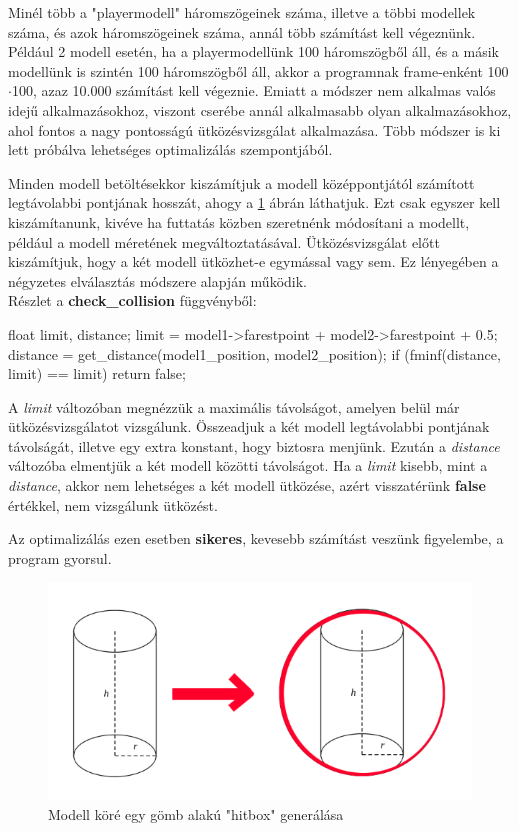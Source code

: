 
Minél több a "playermodell" háromszögeinek száma, illetve a többi modellek száma, és azok háromszögeinek száma, annál több számítást kell végeznünk. Például 2 modell esetén, ha a playermodellünk 100 háromszögből áll, és a másik modellünk is szintén 100 háromszögből áll, akkor a programnak frame-enként 100$\cdot$100, azaz 10.000 számítást kell végeznie. Emiatt a módszer nem alkalmas valós idejű alkalmazásokhoz, viszont cserébe annál alkalmasabb olyan alkalmazásokhoz, ahol fontos a nagy pontosságú ütközésvizsgálat alkalmazása. Több módszer is ki lett próbálva lehetséges optimalizálás szempontjából.

Minden modell betöltésekkor kiszámítjuk a modell középpontjától számított legtávolabbi pontjának hosszát, ahogy a \ref{fig:opt_1} ábrán láthatjuk. Ezt csak egyszer kell kiszámítanunk, kivéve ha futtatás közben szeretnénk módosítani a modellt, például a modell méretének megváltoztatásával. Ütközésvizsgálat előtt kiszámítjuk, hogy a két modell ütközhet-e egymással vagy sem. Ez lényegében a négyzetes elválasztás módszere alapján működik.
\\
Részlet a \textbf{check\_collision} függvényből:
\begin{cpp}
float limit, distance;
limit = model1->farestpoint + model2->farestpoint + 0.5;
distance = get_distance(model1_position, model2_position);
if (fminf(distance, limit) == limit)
{
    return false;
}
\end{cpp}
\newpage
A \textit{limit} változóban megnézzük a maximális távolságot, amelyen belül már ütközésvizsgálatot vizsgálunk. Összeadjuk a két modell legtávolabbi pontjának távolságát, illetve egy extra konstant, hogy biztosra menjünk. Ezután a \textit{distance} változóba elmentjük a két modell közötti távolságot. Ha a \textit{limit} kisebb, mint a \textit{distance}, akkor nem lehetséges a két modell ütközése, azért visszatérünk \textbf{false} értékkel, nem vizsgálunk ütközést.

Az optimalizálás ezen esetben \textbf{sikeres}, kevesebb számítást veszünk figyelembe, a program gyorsul.
\begin{figure}[h]
	\centering
	\includegraphics[width=13truecm, height=7.5truecm]{images/opt_5.1.png}
	\caption{Modell köré egy gömb alakú "hitbox" generálása}
	\label{fig:opt_1}
\end{figure}

